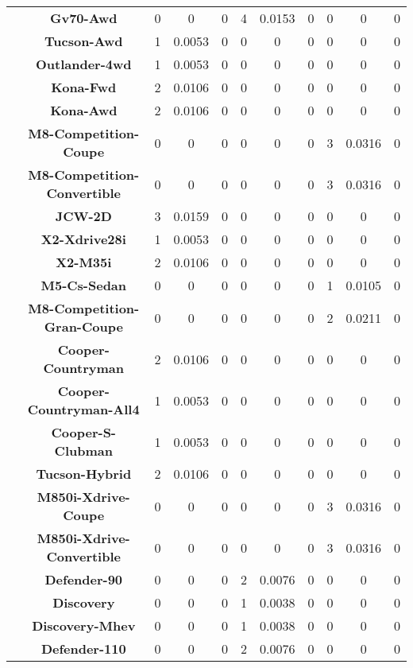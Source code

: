 \begin{center}
\begin{tabular}{|c|c||@{\hspace{1ex}}||c|c|c||@{\hspace{1ex}}||c|c|c||@{\hspace{1ex}}||c|c|c||@{\hspace{1ex}}||}
\cline{2-11}
  & {\bf Gv70-Awd} & 0 & 0 & 0 & 4 & 0.0153 & 0 & 0 & 0 & 0 \\
\cline{2-11}
  & {\bf Tucson-Awd} & 1 & 0.0053 & 0 & 0 & 0 & 0 & 0 & 0 & 0 \\
\cline{2-11}
  & {\bf Outlander-4wd} & 1 & 0.0053 & 0 & 0 & 0 & 0 & 0 & 0 & 0 \\
\cline{2-11}
  & {\bf Kona-Fwd} & 2 & 0.0106 & 0 & 0 & 0 & 0 & 0 & 0 & 0 \\
\cline{2-11}
  & {\bf Kona-Awd} & 2 & 0.0106 & 0 & 0 & 0 & 0 & 0 & 0 & 0 \\
\cline{2-11}
  & {\bf M8-Competition-Coupe} & 0 & 0 & 0 & 0 & 0 & 0 & 3 & 0.0316 & 0 \\
\cline{2-11}
  & {\bf M8-Competition-Convertible} & 0 & 0 & 0 & 0 & 0 & 0 & 3 & 0.0316 & 0 \\
\cline{2-11}
  & {\bf JCW-2D} & 3 & 0.0159 & 0 & 0 & 0 & 0 & 0 & 0 & 0 \\
\cline{2-11}
  & {\bf X2-Xdrive28i} & 1 & 0.0053 & 0 & 0 & 0 & 0 & 0 & 0 & 0 \\
\cline{2-11}
  & {\bf X2-M35i} & 2 & 0.0106 & 0 & 0 & 0 & 0 & 0 & 0 & 0 \\
\cline{2-11}
  & {\bf M5-Cs-Sedan} & 0 & 0 & 0 & 0 & 0 & 0 & 1 & 0.0105 & 0 \\
\cline{2-11}
  & {\bf M8-Competition-Gran-Coupe} & 0 & 0 & 0 & 0 & 0 & 0 & 2 & 0.0211 & 0 \\
\cline{2-11}
  & {\bf Cooper-Countryman} & 2 & 0.0106 & 0 & 0 & 0 & 0 & 0 & 0 & 0 \\
\cline{2-11}
  & {\bf Cooper-Countryman-All4} & 1 & 0.0053 & 0 & 0 & 0 & 0 & 0 & 0 & 0 \\
\cline{2-11}
  & {\bf Cooper-S-Clubman} & 1 & 0.0053 & 0 & 0 & 0 & 0 & 0 & 0 & 0 \\
\cline{2-11}
  & {\bf Tucson-Hybrid} & 2 & 0.0106 & 0 & 0 & 0 & 0 & 0 & 0 & 0 \\
\cline{2-11}
  & {\bf M850i-Xdrive-Coupe} & 0 & 0 & 0 & 0 & 0 & 0 & 3 & 0.0316 & 0 \\
\cline{2-11}
  & {\bf M850i-Xdrive-Convertible} & 0 & 0 & 0 & 0 & 0 & 0 & 3 & 0.0316 & 0 \\
\cline{2-11}
  & {\bf Defender-90} & 0 & 0 & 0 & 2 & 0.0076 & 0 & 0 & 0 & 0 \\
\cline{2-11}
  & {\bf Discovery} & 0 & 0 & 0 & 1 & 0.0038 & 0 & 0 & 0 & 0 \\
\cline{2-11}
  & {\bf Discovery-Mhev} & 0 & 0 & 0 & 1 & 0.0038 & 0 & 0 & 0 & 0 \\
\cline{2-11}
  & {\bf Defender-110} & 0 & 0 & 0 & 2 & 0.0076 & 0 & 0 & 0 & 0 \\

\end{tabular}
\end{center}
